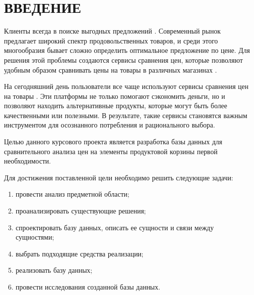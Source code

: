 
\chapter*{ВВЕДЕНИЕ}

Клиенты всегда в поиске выгодных предложений \cite{info_theme_cmp_prices}. Современный рынок предлагает широкий спектр продовольственных товаров, и среди этого многообразия бывает сложно определить оптимальное предложение по цене. Для решения этой проблемы создаются сервисы сравнения цен, которые позволяют удобным образом сравнивать цены на товары в различных магазинах \cite{info_cmp_prices}. 

На сегодняшний день пользователи все чаще используют сервисы сравнения цен на товары \cite{info_stat_cmp_prices}. Эти платформы не только помогают сэкономить деньги, но и позволяют находить альтернативные продукты, которые могут быть более качественными или полезными. В результате, такие сервисы становятся важным инструментом для осознанного потребления и рационального выбора.

Целью данного курсового проекта является разработка базы данных для сравнительного анализа цен на элементы продуктовой корзины первой необходимости.

Для достижения поставленной цели необходимо решить следующие задачи: 

\begin{enumerate}[label={\arabic*)}]
	\item провести анализ предметной области;
	\item проанализировать существующие решения;
	\item спроектировать базу данных, описать ее сущности и связи между сущностями;
	\item выбрать подходящие средства реализации;
	\item реализовать базу данных;
	\item провести исследования созданной базы данных.
\end{enumerate}

